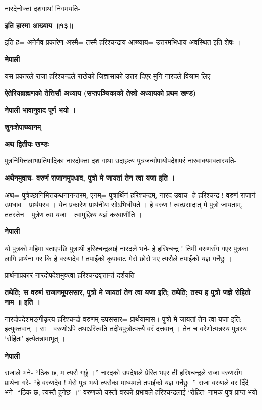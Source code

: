 \documentclass[11pt, a5paper]{article}
\begin{document}
नारदेनोक्तां दशगाथां निगमयति-

\textbf{इति हास्मा आख्याय ॥१३॥}

इति ह= अनेनैव प्रकारेण अस्मै= तस्मै हरिश्चन्द्राय आख्याय= उत्तरमभिधाय अवस्थित इति शेषः ।

\textbf{नेपाली}

यस प्रकारले राजा हरिश्चन्द्रले राखेको जिज्ञासाको उत्तर दिएर मुनि नारदले विश्राम लिए ।

\textbf{ऐतेरियब्राह्मणको  तेत्तिसौं अध्याय (सप्तपञ्चिकाको तेस्रो अध्यायको प्रथम खण्ड)}

\textbf{नेपाली भावानुवाद पूर्ण भयो ।}

\textbf{शुनःशेपाख्यानम्}

\textbf{अथ द्वितीयः खण्डः}

पुत्रनिमित्तलाभप्रतिपादिका नारदोक्ता दश गाथा उदाहृत्य पुत्रजन्मोपायोपदेशपरं नारवाक्यमवतारयति-

\textbf{अथैनमुवाच- वरुणं राजानमुपधाव, पुत्रो मे जायतां तेन त्वा यजा इति ।}

अथ= पुत्रेच्छानिमित्तकथनानन्तरम्, एनम्= पुत्रार्थिनं हरिश्चन्द्रम्, नारद उवाच- हे हरिश्चन्द्र ! वरुणं राजानं उपधाव= प्रार्थयस्व । येन प्रकारेण प्रार्थनीयः सोऽभिधीयते । हे वरुण ! त्वत्प्रसादात् मे पुत्रो जायताम्, ततस्तेन= पुत्रेण त्वा यजा= त्वामुद्दिश्य यज्ञं करवाणीति ।

\textbf{नेपाली}

यो पुत्रको महिमा बताएपछि पुत्रार्थी हरिश्चन्द्रलाई नारदले भने- हे हरिश्चन्द्र ! तिमी वरुणसँग गएर पुत्रका लागि प्रार्थना गर कि हे वरुणदेव ! तपाईंको कृपाबाट मेरो छोरो भए त्यसैले तपाईंको यज्ञ गर्नेछु ।

प्रार्थनाप्रकारं नारदोपदेशमुक्त्वा हरिश्चन्द्रवृत्तान्तं दर्शयति-

\textbf{तथेति; स वरुणं राजानमुपससार, पुत्रो मे जायतां तेन त्वा यजा इति;  तथेति; तस्य ह पुत्रो जज्ञे रोहितो नाम ॥ इति ।}

नारदोपदेशमङ्गीकृत्य हरिश्चन्द्रो वरुणम् उपससार= प्रार्थयामास। पुत्रो मे जायतां तेन त्वा यजा इति; इत्युक्तवान् । सः= वरुणोऽपि तथाऽस्त्विति तदीयपुत्रोत्पत्त्यै वरं दत्तवान् । तेन च वरेणोत्पन्नस्य पुत्रस्य ‘रोहितः’ इत्येतन्नामाभूत् ।

\textbf{नेपाली}

राजाले भने- “ठिक छ, म त्यसै गर्छु ।” नारदको उपदेशले प्रेरित भएर ती हरिश्चन्द्रले राजा वरुणसँग प्रार्थना गरे- “हे वरुणदेव ! मेरो पुत्र भयो त्यसैका माध्यमले तपाईंको यज्ञ गर्नेछु।” राजा वरुणले वर दिँदै भने- “ठिक छ, त्यस्तै हुनेछ ।” वरुणको यस्तो वरको प्रभावले हरिश्चन्द्रलाई ‘रोहित’ नामक पुत्र प्राप्त भयो ।
\end{document}
